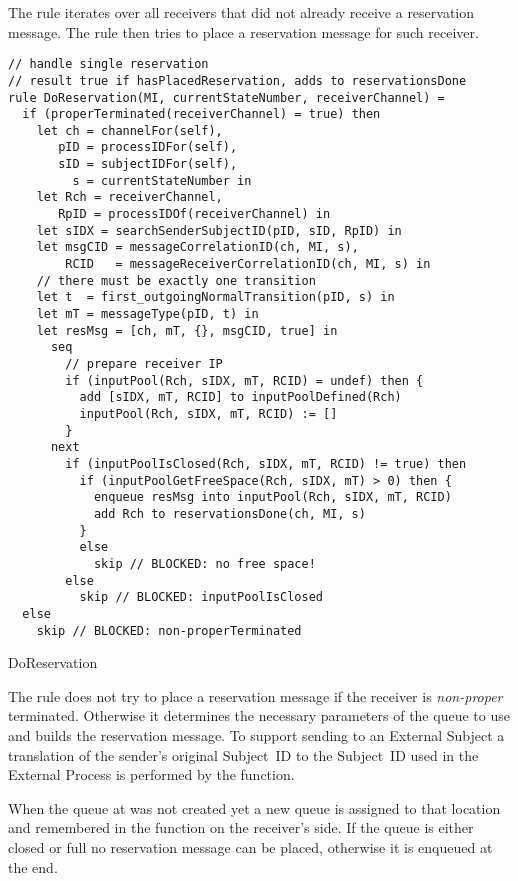 The  rule iterates over all receivers that did not
already receive a reservation message. The  rule
then tries to place a reservation message for such receiver.

\begin{listing}[H]
\begin{verbatim}
// handle single reservation
// result true if hasPlacedReservation, adds to reservationsDone
rule DoReservation(MI, currentStateNumber, receiverChannel) =
  if (properTerminated(receiverChannel) = true) then
    let ch = channelFor(self),
       pID = processIDFor(self),
       sID = subjectIDFor(self),
         s = currentStateNumber in
    let Rch = receiverChannel,
       RpID = processIDOf(receiverChannel) in
    let sIDX = searchSenderSubjectID(pID, sID, RpID) in
    let msgCID = messageCorrelationID(ch, MI, s),
        RCID   = messageReceiverCorrelationID(ch, MI, s) in
    // there must be exactly one transition
    let t  = first_outgoingNormalTransition(pID, s) in
    let mT = messageType(pID, t) in
    let resMsg = [ch, mT, {}, msgCID, true] in
      seq
        // prepare receiver IP
        if (inputPool(Rch, sIDX, mT, RCID) = undef) then {
          add [sIDX, mT, RCID] to inputPoolDefined(Rch)
          inputPool(Rch, sIDX, mT, RCID) := []
        }
      next
        if (inputPoolIsClosed(Rch, sIDX, mT, RCID) != true) then
          if (inputPoolGetFreeSpace(Rch, sIDX, mT) > 0) then {
            enqueue resMsg into inputPool(Rch, sIDX, mT, RCID)
            add Rch to reservationsDone(ch, MI, s)
          }
          else
            skip // BLOCKED: no free space!
        else
          skip // BLOCKED: inputPoolIsClosed
  else
    skip // BLOCKED: non-properTerminated
\end{verbatim}
\caption{DoReservation}
\label{lst:shortasm:DoReservation}
\end{listing}


The  rule does not try to place a reservation message
if the receiver is \textit{non-proper} terminated. Otherwise it determines
the necessary parameters of the queue to use and builds the reservation message.
To support sending to an External Subject a translation of the sender's original
Subject~ID to the Subject~ID used in the External Process is performed by the
 function.

When the queue at  was not
created yet a new queue is assigned to that location and remembered in the
 function on the receiver's side.
If the queue is either closed or full no reservation message can be placed,
otherwise it is enqueued at the end.



